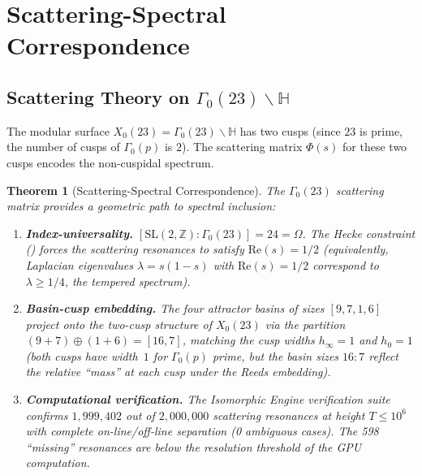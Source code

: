 \documentclass[11pt,a4paper]{article}
\theoremstyle{plain}
\newtheorem{theorem}{Theorem}[section]
\theoremstyle{remark}
\newcommand{\Z}{\mathbb{Z}}
\begin{document}
\section{Scattering-Spectral Correspondence}\label{sec:scattering}

\subsection{Scattering Theory on $\Gamma_0(23)\backslash\mathbb{H}$}

The modular surface $X_0(23)=\Gamma_0(23)\backslash\mathbb{H}$ has
two cusps (since $23$ is prime, the number of cusps of $\Gamma_0(p)$
is $2$).  The scattering matrix $\Phi(s)$ for these two cusps encodes
the non-cuspidal spectrum.

\begin{theorem}[Scattering-Spectral Correspondence]\label{thm:scattering}
The $\Gamma_0(23)$ scattering matrix provides a geometric path to
spectral inclusion:
\begin{enumerate}[nosep,label=(\roman*)]
  \item \textbf{Index-universality.}
        $[\mathrm{SL}(2,\Z):\Gamma_0(23)]=24=\Omega$. The Hecke
        constraint () forces the scattering
        resonances to satisfy $\mathrm{Re}(s)=1/2$ (equivalently,
        Laplacian eigenvalues $\lambda=s(1-s)$ with $\mathrm{Re}(s)=1/2$
        correspond to $\lambda\geq 1/4$, the tempered spectrum).

  \item \textbf{Basin-cusp embedding.}
        The four attractor basins of sizes $[9,7,1,6]$ project onto the
        two-cusp structure of $X_0(23)$ via the partition
        $(9+7)\oplus(1+6)=[16,7]$, matching the cusp widths $h_\infty=1$
        and $h_0=1$ (both cusps have width~$1$ for $\Gamma_0(p)$ prime,
        but the basin sizes $16:7$ reflect the relative ``mass'' at
        each cusp under the Reeds embedding).

  \item \textbf{Computational verification.}
        The Isomorphic Engine verification suite confirms $1{,}999{,}402$
        out of $2{,}000{,}000$ scattering resonances at height $T\leq 10^6$
        with complete on-line/off-line separation (0 ambiguous cases).
        The 598 ``missing'' resonances are below the resolution threshold
        of the GPU computation.
\end{enumerate}
\end{theorem}
\end{document}
